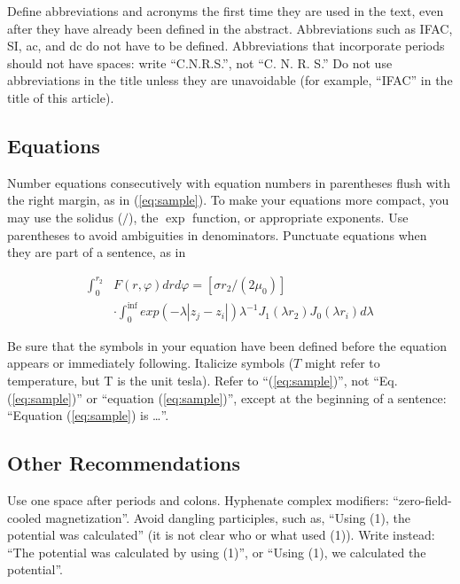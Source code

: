 \documentclass{ifacconf}
\begin{document}
Define abbreviations and acronyms the first time they are used in the
text, even after they have already been defined in the
abstract. Abbreviations such as IFAC, SI, ac, and dc do not have to be
defined. Abbreviations that incorporate periods should not have
spaces: write ``C.N.R.S.'', not ``C. N. R. S.'' Do not use abbreviations
in the title unless they are unavoidable (for example, ``IFAC'' in the
title of this article).

\subsection{Equations}

Number equations consecutively with equation numbers in parentheses
flush with the right margin, as in (\ref{eq:sample}).  To make your equations more
compact, you may use the solidus ($/$), the $\exp$ function, or
appropriate exponents. Use parentheses to avoid ambiguities in
denominators. Punctuate equations when they are part of a sentence, as
in

\begin{equation} \label{eq:sample2}
\begin{array}{ll}
\int_0^{r_2} & F (r, \varphi ) dr d\varphi = [\sigma r_2 / (2 \mu_0 )] \\
& \cdot \int_0^{\inf} exp(-\lambda |z_j - z_i |) \lambda^{-1} J_1 (\lambda  r_2 ) J_0 (\lambda r_i ) d\lambda 
\end{array}
\end{equation}

Be sure that the symbols in your equation have been defined before the
equation appears or immediately following. Italicize symbols ($T$
might refer to temperature, but T is the unit tesla). Refer to
``(\ref{eq:sample})'', not ``Eq. (\ref{eq:sample})'' or ``equation
(\ref{eq:sample})'', except at the beginning of a sentence: ``Equation
(\ref{eq:sample}) is \ldots''.

\subsection{Other Recommendations}

Use one space after periods and colons. Hyphenate complex modifiers:
``zero-field-cooled magnetization''. Avoid dangling participles, such
as, ``Using (1), the potential was calculated'' (it is not clear who or
what used (1)). Write instead: ``The potential was calculated by using
(1)'', or ``Using (1), we calculated the potential''.
\end{document}
